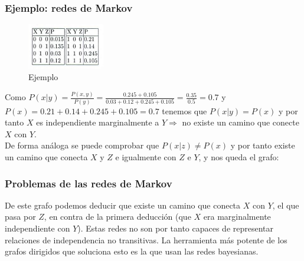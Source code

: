 \documentclass[leqno]{beamer}
\begin{document}
\begin{frame}
\frametitle{Ejemplo: redes de Markov}

\begin{figure}
\includegraphics[width=0.3\textwidth]{ejemplo}
\caption{Ejemplo} \label{fig:ejemplo}
\end{figure}

Como $P(x|y)=\frac{P(x,y)}{P(y)} = \frac{0.245+0.105}{0.03+0.12+0.245+0.105} = \frac{0.35}{0.5} = 0.7$ y $P(x)=0.21+0.14+0.245+0.105 = 0.7$ tenemos que $P(x|y)=P(x)$ y por tanto $X$ es independiente marginalmente a $Y \Rightarrow$ no existe un camino que conecte $X$ con $Y$.\\
De forma análoga se puede comprobar que $P(x|z)\neq P(x)$ y por tanto existe un camino que conecta $X$ y $Z$ e igualmente con $Z$ e $Y$, y nos queda el grafo:
\begin{center}
\end{center}

\end{frame}

\begin{frame}
\frametitle{Problemas de las redes de Markov}
\begin{center}
\end{center}

De este grafo podemos deducir que existe un camino que conecta $X$ con $Y$, el que pasa por $Z$, en contra de la primera deducción (que $X$ era marginalmente independiente con $Y$). Estas redes no son por tanto capaces de representar relaciones de independencia no transitivas. La herramienta más potente de los grafos dirigidos que soluciona esto es la que usan las redes bayesianas.
\end{frame}
\end{document}

